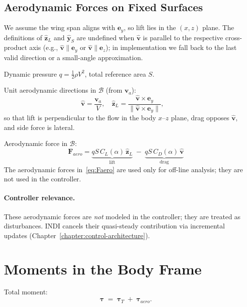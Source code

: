 \subsection{Aerodynamic Forces on Fixed Surfaces}
We assume the wing span aligns with $\mathbf{e}_y$, so lift lies in the $(x,z)$ plane.
The definitions of $\hat{\mathbf{z}}_L$ and $\hat{\mathbf{y}}_S$ are undefined when $\hat{\mathbf{v}}$ is parallel to the respective cross-product axis (e.g., $\hat{\mathbf{v}}\parallel\mathbf{e}_y$ or $\hat{\mathbf{v}}\parallel\mathbf{e}_z$); in implementation we fall back to the last valid direction or a small-angle approximation.

Dynamic pressure $q=\tfrac{1}{2}\rho V^2$, total reference area $S$.

Unit aerodynamic directions in $\mathcal{B}$ (from $\mathbf{v}_a$):
\[
\hat{\mathbf{v}}=\frac{\mathbf{v}_a}{V},\quad
\hat{\mathbf{z}}_L=\frac{\hat{\mathbf{v}}\times\mathbf{e}_y}{\|\hat{\mathbf{v}}\times\mathbf{e}_y\|},\quad
\]
so that lift is perpendicular to the flow in the body $x$–$z$ plane, drag opposes $\hat{\mathbf{v}}$, and side force is lateral.

Aerodynamic force in $\mathcal{B}$:
\begin{equation}
\mathbf{F}_{\!aero}
= \underbrace{q S\,C_L(\alpha)\,\hat{\mathbf{z}}_L}_{\text{lift}}
\;-\; \underbrace{q S\,C_D(\alpha)\,\hat{\mathbf{v}}}_{\text{drag}}
\label{eq:Faero}
\end{equation}
The aerodynamic forces in~\eqref{eq:Faero} are used only for off-line analysis; they are not used in the controller.

\paragraph{Controller relevance.}
These aerodynamic forces are \emph{not} modeled in the controller; they are treated as disturbances. INDI cancels their quasi-steady contribution via incremental updates (Chapter~\ref{chapter:control-architecture}).

\section{Moments in the Body Frame}
Total moment:
\begin{equation}
\boldsymbol{\tau} \;=\; \boldsymbol{\tau}_T \;+\; \boldsymbol{\tau}_{\!aero}.
\end{equation}

